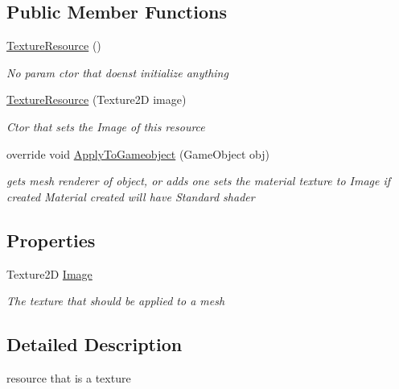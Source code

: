 \subsection*{Public Member Functions}
\begin{DoxyCompactItemize}
\item 
\mbox{\hyperlink{class_texture_resource_a0894cbc7a8beb5f98d49e707f3dd086f}{Texture\+Resource}} ()
\begin{DoxyCompactList}\small\item\em No param ctor that doens\textquotesingle{}t initialize anything \end{DoxyCompactList}\item 
\mbox{\hyperlink{class_texture_resource_ae384d5352de9bd731fb05d9d20c37f0f}{Texture\+Resource}} (Texture2D image)
\begin{DoxyCompactList}\small\item\em Ctor that sets the Image of this resource \end{DoxyCompactList}\item 
override void \mbox{\hyperlink{class_texture_resource_a29bbc4442f2a390b5f40cab63c01b282}{Apply\+To\+Gameobject}} (Game\+Object obj)
\begin{DoxyCompactList}\small\item\em gets mesh renderer of object, or adds one sets the material texture to Image if created Material created will have Standard shader \end{DoxyCompactList}\end{DoxyCompactItemize}
\subsection*{Properties}
\begin{DoxyCompactItemize}
\item 
Texture2D \mbox{\hyperlink{class_texture_resource_a0b9a7b94d4b0ace91e08d02a0b785c2e}{Image}}
\begin{DoxyCompactList}\small\item\em The texture that should be applied to a mesh \end{DoxyCompactList}\end{DoxyCompactItemize}


\subsection{Detailed Description}
resource that is a texture 




